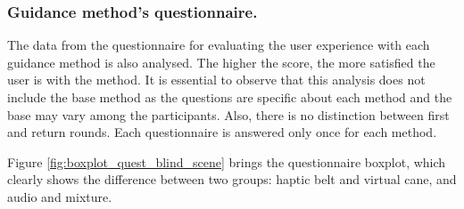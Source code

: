\subsubsection{Guidance method's questionnaire.}
\label{subsubsec:results_questionnaires}

The data from the questionnaire for evaluating the user experience with each guidance method is also analysed. The higher the score, the more satisfied the user is with the method. It is essential to observe that this analysis does not include the base method as the questions are specific about each method and the base may vary among the participants. Also, there is no distinction between first and return rounds. Each questionnaire is answered only once for each method.


%


Figure \ref{fig:boxplot_quest_blind_scene} brings the questionnaire boxplot, which clearly shows the difference between two groups: haptic belt and virtual cane, and audio and mixture. 

